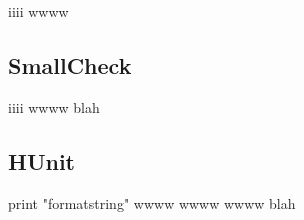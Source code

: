\documentclass{refcard}
\begin{document}
\begin{ldesc}
	\li[iiii] iiii
	\li[wwww] wwww
\end{ldesc}

\subsection{SmallCheck \hfill {}}

\begin{ldesc}
	\li[iiii] iiii
	\li       wwww
	\li[blah] blah
\end{ldesc}


\subsection{HUnit \hfill {}}

\begin{ldesc}
	\li[printing] print "formatstring"
	\li[wwww] wwww
	\li[iiii] wwww
	\li       wwww
	\li[blah] blah
\end{ldesc}
\end{document}
